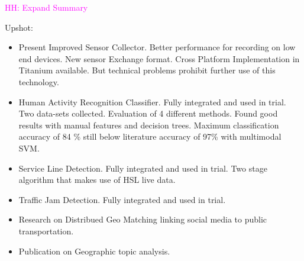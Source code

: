 \documentclass[external]{20120615_deliverable_template_ukob}
\theoremstyle{definition}
\newcommand{\todo}[2]{\textcolor{magenta}{#1: #2}}
\begin{document}
\begin{LGExecutiveSummary}
  \vspace{10pt} 

\todo{HH}{Expand Summary}

Upshot:
\begin{itemize}
\item Present Improved Sensor Collector. Better performance for
  recording on low end devices. New sensor Exchange format.
  Cross Platform Implementation in Titanium available. But technical
  problems prohibit further use of this technology.
\item Human Activity Recognition Classifier. Fully integrated and used
  in trial. Two data-sets collected. Evaluation of 4 different
  methods. Found good results with manual features and decision
  trees. Maximum classification accuracy of 84 \% still below 
  literature accuracy of 97\% with multimodal SVM.
\item Service Line Detection. Fully integrated and used in trial. Two
  stage algorithm that makes use of HSL live data.
\item Traffic Jam Detection. Fully integrated and used in trial.
\item Research on Distribued Geo Matching linking social media to
  public transportation.
\item Publication on Geographic topic analysis.
\end{itemize}



\end{LGExecutiveSummary}
\end{document}

